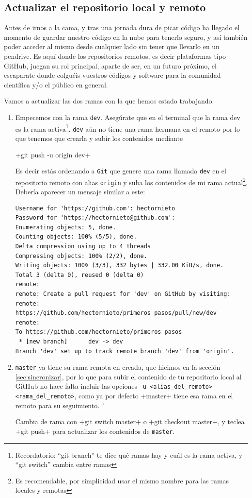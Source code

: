 \documentclass[a5paper,10pt]{article}
\begin{document}
   \subsection{Actualizar el repositorio  local y remoto}
    Antes de irnos a la cama, y tras una jornada dura de picar código ha llegado el momento de guardar nuestro código en la nube para tenerlo seguro, y así también poder acceder al mismo desde cualquier lado sin tener que llevarlo en un pendrive. Es aquí donde los repositorios remotos, es decir plataformas tipo GitHub, juegan su rol principal, aparte de ser, en un futuro próximo, el escaparate donde colguéis vuestros códigos y software para la comunidad científica y/o el público en general.
    
    Vamos a actualizar las dos ramas con la que hemos estado trabajando. 
    \begin{enumerate}
    
     \item Empecemos con la rama \verb+dev+. Asegúrate que en el terminal que la rama dev es la rama activa\footnote{Recordatorio: ``git branch'' te dice qué ramas hay y cuál es la rama activa, y ``git switch'' cambia entre ramas}. \verb+dev+ aún no tiene una rama hermana en el remoto por lo que tenemos que crearla y subir los contenidos mediante
     
     \cverb+git push -u origin dev+
     
     Es decir estás ordenando a \verb+Git+ que genere una rama llamada \verb+dev+ en el repositorio remoto con alias \verb+origin+ y suba los contenidos de mi rama actual\footnote{Es recomendable, por simplicidad usar el mismo nombre para las ramas locales y remotas}. Debería aparecer un mensaje similar a este:
     \begin{lstlisting}[style=custom]
Username for 'https://github.com': hectornieto
Password for 'https://hectornieto@github.com': 
Enumerating objects: 5, done.
Counting objects: 100% (5/5), done.
Delta compression using up to 4 threads
Compressing objects: 100% (2/2), done.
Writing objects: 100% (3/3), 332 bytes | 332.00 KiB/s, done.
Total 3 (delta 0), reused 0 (delta 0)
remote: 
remote: Create a pull request for 'dev' on GitHub by visiting:
remote:      https://github.com/hectornieto/primeros_pasos/pull/new/dev
remote: 
To https://github.com/hectornieto/primeros_pasos
 * [new branch]      dev -> dev
Branch 'dev' set up to track remote branch 'dev' from 'origin'.
     \end{lstlisting}

     
     \item \verb+master+ ya tiene su rama remota en creada, que hicimos en la sección \ref{sec:sincronizar}, por lo que para subir el contenido de tu repositorio local al GitHub no hace falta incluir las opciones \verb+-u <alias_del_remoto> <rama_del_remoto>+, como ya por defecto \cverb+master+ tiene esa rama en el remoto para su seguimiento. ´
     
     Cambia de rama con \cverb+git switch master+ o \cverb+git checkout master+, y teclea \cverb+git push+ para actualizar los contenidos de \verb+master+.
     
    \end{enumerate}
      
\end{document}
